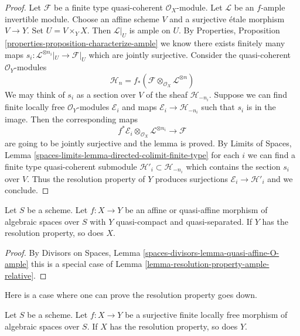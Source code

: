\begin{proof}
Let $\mathcal{F}$ be a finite type quasi-coherent $\mathcal{O}_X$-module.
Let $\mathcal{L}$ be an $f$-ample invertible module.
Choose an affine scheme $V$ and a surjective \'etale morphism $V \to Y$.
Set $U = V \times_Y X$. Then $\mathcal{L}|_U$ is ample on $U$.
By Properties, Proposition
\ref{properties-proposition-characterize-ample}
we know there exists finitely many maps
$s_i : \mathcal{L}^{\otimes n_i}|_U \to \mathcal{F}|_U$
which are jointly surjective. Consider the quasi-coherent
$\mathcal{O}_Y$-modules
$$
\mathcal{H}_n =
f_*(\mathcal{F} \otimes_{\mathcal{O}_X} \mathcal{L}^{\otimes n})
$$
We may think of $s_i$ as a section over $V$ of the sheaf
$\mathcal{H}_{-n_i}$. Suppose we can find finite locally
free $\mathcal{O}_Y$-modules $\mathcal{E}_i$ and maps
$\mathcal{E}_i \to \mathcal{H}_{-n_i}$ such that
$s_i$ is in the image. Then the corresponding maps
$$
f^*\mathcal{E}_i
\otimes_{\mathcal{O}_X}
\mathcal{L}^{\otimes n_i} \longrightarrow \mathcal{F}
$$
are going to be jointly surjective and the lemma is proved. By
Limits of Spaces, Lemma \ref{spaces-limits-lemma-directed-colimit-finite-type}
for each $i$ we can find a finite type quasi-coherent submodule
$\mathcal{H}'_i \subset  \mathcal{H}_{-n_i}$
which contains the section $s_i$ over $V$.
Thus the resolution property of $Y$ produces surjections
$\mathcal{E}_i \to \mathcal{H}'_i$ and we conclude.
\end{proof}

\begin{lemma}
\label{lemma-resolution-property-goes-up-affine}
Let $S$ be a scheme.
Let $f : X \to Y$ be an affine or quasi-affine morphism of
algebraic spaces over $S$ with
$Y$ quasi-compact and quasi-separated.
If $Y$ has the resolution property, so does $X$.
\end{lemma}

\begin{proof}
By Divisors on Spaces, Lemma \ref{spaces-divisors-lemma-quasi-affine-O-ample}
this is a special case of
Lemma \ref{lemma-resolution-property-ample-relative}.
\end{proof}

\noindent
Here is a case where one can prove the resolution property goes down.

\begin{lemma}
\label{lemma-resolution-property-goes-down-finite-flat}
Let $S$ be a scheme.
Let $f : X \to Y$ be a surjective finite locally free morphism of
algebraic spaces over $S$.
If $X$ has the resolution property, so does $Y$.
\end{lemma}

